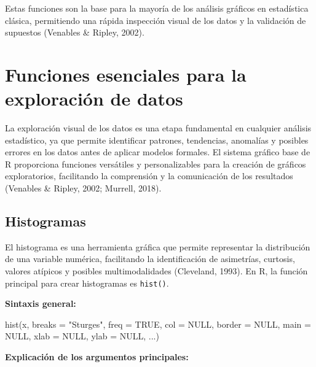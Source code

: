 \documentclass[
  spanish,
  a4paper,
  DIV=11,
  numbers=noendperiod,
  onepage,
  openany]{scrreprt}
\newenvironment{Shaded}{\begin{snugshade}}{\end{snugshade}}
\newcommand{\AttributeTok}[1]{\textcolor[rgb]{0.40,0.45,0.13}{#1}}
\newcommand{\ConstantTok}[1]{\textcolor[rgb]{0.56,0.35,0.01}{#1}}
\newcommand{\FunctionTok}[1]{\textcolor[rgb]{0.28,0.35,0.67}{#1}}
\newcommand{\NormalTok}[1]{\textcolor[rgb]{0.00,0.23,0.31}{#1}}
\newcommand{\StringTok}[1]{\textcolor[rgb]{0.13,0.47,0.30}{#1}}
\begin{document}
Estas funciones son la base para la mayoría de los análisis gráficos en
estadística clásica, permitiendo una rápida inspección visual de los
datos y la validación de supuestos (Venables \& Ripley, 2002).

\section{Funciones esenciales para la exploración de
datos}\label{funciones-esenciales-para-la-exploraciuxf3n-de-datos}

La exploración visual de los datos es una etapa fundamental en cualquier
análisis estadístico, ya que permite identificar patrones, tendencias,
anomalías y posibles errores en los datos antes de aplicar modelos
formales. El sistema gráfico base de R proporciona funciones versátiles
y personalizables para la creación de gráficos exploratorios,
facilitando la comprensión y la comunicación de los resultados (Venables
\& Ripley, 2002; Murrell, 2018).

\subsection{Histogramas}\label{histogramas-1}

El histograma es una herramienta gráfica que permite representar la
distribución de una variable numérica, facilitando la identificación de
asimetrías, curtosis, valores atípicos y posibles multimodalidades
(Cleveland, 1993). En R, la función principal para crear histogramas es
\texttt{hist()}.

\textbf{Sintaxis general:}

\begin{Shaded}
\begin{Highlighting}[]
\FunctionTok{hist}\NormalTok{(x, }
     \AttributeTok{breaks =} \StringTok{"Sturges"}\NormalTok{, }
     \AttributeTok{freq =} \ConstantTok{TRUE}\NormalTok{, }
     \AttributeTok{col =} \ConstantTok{NULL}\NormalTok{, }
     \AttributeTok{border =} \ConstantTok{NULL}\NormalTok{, }
     \AttributeTok{main =} \ConstantTok{NULL}\NormalTok{, }
     \AttributeTok{xlab =} \ConstantTok{NULL}\NormalTok{, }
     \AttributeTok{ylab =} \ConstantTok{NULL}\NormalTok{, }
\NormalTok{     ...)}
\end{Highlighting}
\end{Shaded}

\textbf{Explicación de los argumentos principales:}
\end{document}
